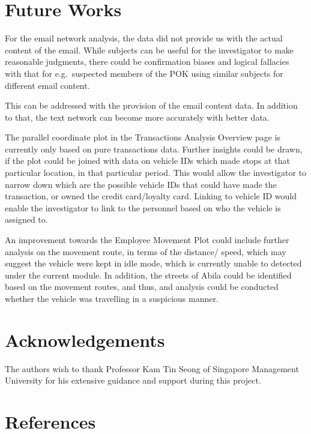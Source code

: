\documentclass{acm_proc_article-sp}
\begin{document}
\hypertarget{future-works}{%
\section{Future Works}\label{future-works}}

For the email network analysis, the data did not provide us with the
actual content of the email. While subjects can be useful for the
investigator to make reasonable judgments, there could be confirmation
biases and logical fallacies with that for e.g.~suspected members of the
POK using similar subjects for different email content.

This can be addressed with the provision of the email content data. In
addition to that, the text network can become more accurately with
better data.

The parallel coordinate plot in the Transactions Analysis Overview page
is currently only based on pure transactions data. Further insights
could be drawn, if the plot could be joined with data on vehicle IDs
which made stops at that particular location, in that particular period.
This would allow the investigator to narrow down which are the possible
vehicle IDs that could have made the transaction, or owned the credit
card/loyalty card. Linking to vehicle ID would enable the investigator
to link to the personnel based on who the vehicle is assigned to.

An improvement towards the Employee Movement Plot could include further
analysis on the movement route, in terms of the distance/ speed, which
may suggest the vehicle were kept in idle mode, which is currently
unable to detected under the current module. In addition, the streets of
Abila could be identified based on the movement routes, and thus, and
analysis could be conducted whether the vehicle was travelling in a
suspicious manner.

\hypertarget{acknowledgements}{%
\section{Acknowledgements}\label{acknowledgements}}

The authors wish to thank Professor Kam Tin Seong of Singapore
Management University for his extensive guidance and support during this
project.

\hypertarget{references}{%
\section{References}\label{references}}
\end{document}
